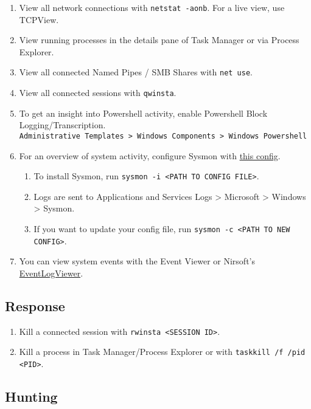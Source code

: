 \documentclass[12pt,letterpaper]{article}
\def\code#1{\textcolor{iris}{\texttt{#1}}}
\begin{document}
\begin{enumerate}
	\item View all network connections with \code{netstat -aonb}. For a live view, use TCPView.
	\item View running processes in the details pane of Task Manager or via Process Explorer.
	\item View all connected Named Pipes / SMB Shares with \code{net use}.
	\item View all connected sessions with \code{qwinsta}.
	\item To get an insight into Powershell activity, enable Powershell Block Logging/Transcription. \\
		\code{Administrative Templates > Windows Components > Windows Powershell}
	\item For an overview of system activity, configure Sysmon with \href{https://github.com/D42H5/cyber\_comp\_resources/blob/main/sysmonconfig-export-modified-2-2-24.xml}{this config}.
	\begin{enumerate}
		\item To install Sysmon, run \code{sysmon -i <PATH TO CONFIG FILE>}.
		\item Logs are sent to Applications and Services Logs > Microsoft > Windows > Sysmon.
		\item If you want to update your config file, run \code{sysmon -c <PATH TO NEW CONFIG>}.
	\end{enumerate}
	\item You can view system events with the Event Viewer or Nirsoft's \href{https://www.nirsoft.net/utils/fulleventlogview-x64.zip}{EventLogViewer}.
\end{enumerate}

\subsection{Response}

\begin{enumerate}
	\item Kill a connected session with \code{rwinsta <SESSION ID>}.
	\item Kill a process in Task Manager/Process Explorer or with \code{taskkill /f /pid <PID>}.
\end{enumerate}

\subsection{Hunting}
\end{document}
